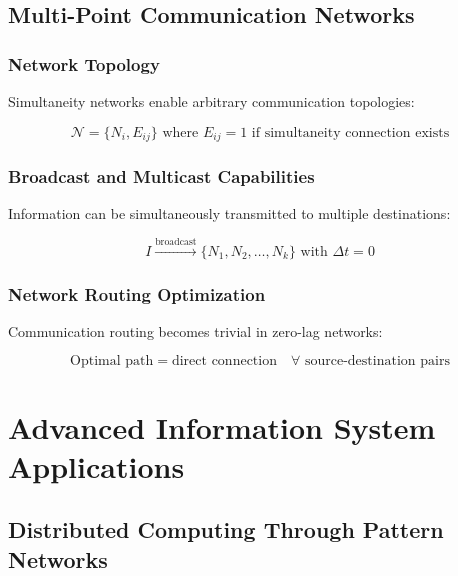 \documentclass[12pt,a4paper]{article}
\begin{document}
\subsection{Multi-Point Communication Networks}

\subsubsection{Network Topology}

Simultaneity networks enable arbitrary communication topologies:

\begin{equation}
\mathcal{N} = \{N_i, E_{ij}\} \text{ where } E_{ij} = 1 \text{ if simultaneity connection exists}
\label{eq:communication_network}
\end{equation}

\subsubsection{Broadcast and Multicast Capabilities}

Information can be simultaneously transmitted to multiple destinations:

\begin{equation}
I \xrightarrow{\text{broadcast}} \{N_1, N_2, \ldots, N_k\} \text{ with } \Delta t = 0
\label{eq:simultaneous_broadcast}
\end{equation}

\subsubsection{Network Routing Optimization}

Communication routing becomes trivial in zero-lag networks:

\begin{equation}
\text{Optimal path} = \text{direct connection} \quad \forall \text{ source-destination pairs}
\label{eq:optimal_routing}
\end{equation}

\section{Advanced Information System Applications}

\subsection{Distributed Computing Through Pattern Networks}
\end{document}
